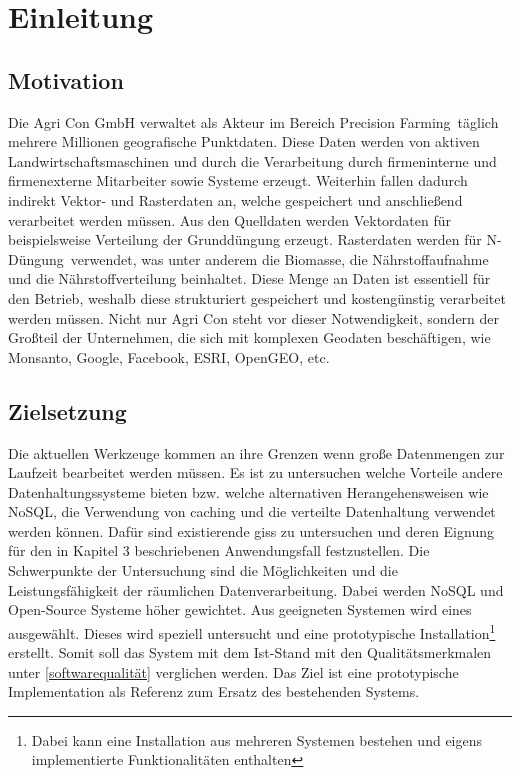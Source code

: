 \chapter{Einleitung}


\section{Motivation}

Die Agri Con GmbH verwaltet als Akteur im Bereich \glqq Precision Farming\grqq\ täglich mehrere Millionen geografische Punktdaten. Diese Daten werden von aktiven Landwirtschaftsmaschinen und durch die Verarbeitung durch firmeninterne und firmenexterne Mitarbeiter sowie Systeme erzeugt. Weiterhin fallen dadurch indirekt Vektor- und Rasterdaten an, welche gespeichert und anschließend verarbeitet werden müssen.
Aus den Quelldaten werden Vektordaten für beispielsweise Verteilung der Grunddüngung erzeugt. Rasterdaten werden für \glqq N-Düngung\grqq\  verwendet, was unter anderem die Biomasse, die Nährstoffaufnahme und die Nährstoffverteilung beinhaltet.
Diese Menge an Daten ist essentiell für den Betrieb, weshalb diese strukturiert gespeichert und kostengünstig verarbeitet werden müssen. Nicht nur Agri Con steht vor dieser Notwendigkeit, sondern der Großteil der Unternehmen, die sich mit komplexen Geodaten beschäftigen, wie Monsanto, Google, Facebook, ESRI, OpenGEO, etc.




\section{Zielsetzung}

Die aktuellen Werkzeuge kommen an ihre Grenzen wenn große Datenmengen zur Laufzeit bearbeitet werden müssen. Es ist zu untersuchen welche Vorteile andere Datenhaltungssysteme bieten bzw. welche alternativen Herangehensweisen wie NoSQL, die Verwendung von caching und die verteilte Datenhaltung verwendet werden können.
Dafür sind existierende \Glspl{gis} zu untersuchen und deren Eignung für den in Kapitel 3 beschriebenen Anwendungsfall festzustellen. Die Schwerpunkte der Untersuchung sind die Möglichkeiten und die Leistungsfähigkeit der räumlichen Datenverarbeitung.
Dabei werden NoSQL und Open-Source Systeme höher gewichtet.
Aus geeigneten Systemen wird eines ausgewählt. Dieses wird speziell untersucht und eine prototypische Installation\footnote{Dabei kann eine Installation aus mehreren Systemen bestehen und eigens implementierte Funktionalitäten enthalten} erstellt.
Somit soll das System mit dem Ist-Stand mit den Qualitätsmerkmalen unter \ref{softwarequalität} verglichen werden.
Das Ziel ist eine prototypische Implementation als Referenz zum Ersatz des bestehenden Systems.

